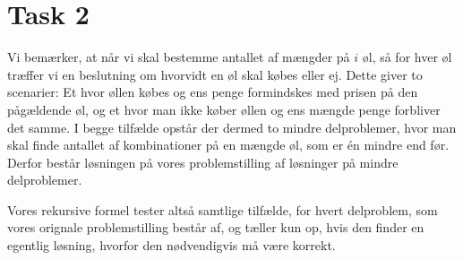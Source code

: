 \section{Task 2}

Vi bemærker, at når vi skal bestemme antallet af mængder på $i$ øl,
så for hver øl træffer vi en beslutning om hvorvidt en øl skal købes eller ej.
Dette giver to scenarier: Et hvor øllen købes og ens penge formindskes med prisen på den pågældende øl, og et hvor man ikke køber øllen og ens mængde penge forbliver det samme. I begge tilfælde opstår der dermed to mindre delproblemer,
hvor man skal finde antallet af kombinationer på en mængde øl, som er én mindre end før. Derfor består løsningen på vores problemstilling af løsninger på mindre delproblemer.

Vores rekursive formel tester altså samtlige tilfælde, for hvert delproblem, som vores orignale problemstilling består af, og tæller kun op, hvis den finder en egentlig løsning, hvorfor den nødvendigvis må være korrekt.

